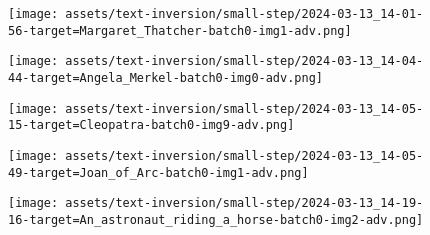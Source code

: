\begin{figure*}[]
\vspace{1ex}
\begin{minipage}[t]{.025\textwidth}
     \vspace{0pt}
\end{minipage}%
\hspace{1ex}
\begin{minipage}[t]{0.98\textwidth}
    \vspace{0pt}
    \begin{subfigure}[t]{0.2\textwidth}
        \texttt{[image: assets/text-inversion/small-step/2024-03-13\_14-01-56-target=Margaret\_Thatcher-batch0-img1-adv.png]}
    \end{subfigure}%
    \begin{subfigure}[t]{0.2\textwidth}
        \texttt{[image: assets/text-inversion/small-step/2024-03-13\_14-04-44-target=Angela\_Merkel-batch0-img0-adv.png]}
    \end{subfigure}%
    \begin{subfigure}[t]{0.2\textwidth}
        \texttt{[image: assets/text-inversion/small-step/2024-03-13\_14-05-15-target=Cleopatra-batch0-img9-adv.png]}
    \end{subfigure}%
    \begin{subfigure}[t]{0.2\textwidth}
        \texttt{[image: assets/text-inversion/small-step/2024-03-13\_14-05-49-target=Joan\_of\_Arc-batch0-img1-adv.png]}
    \end{subfigure}%
    \begin{subfigure}[t]{0.2\textwidth}
        \texttt{[image: assets/text-inversion/small-step/2024-03-13\_14-19-16-target=An\_astronaut\_riding\_a\_horse-batch0-img2-adv.png]}
    \end{subfigure}%
\end{minipage}


\end{figure*}
